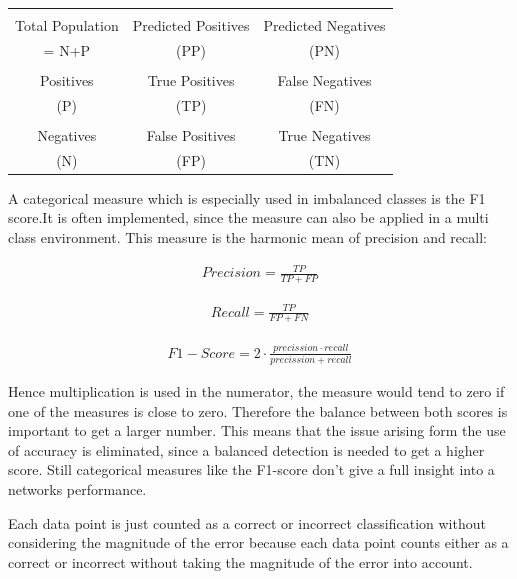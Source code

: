 \documentclass[
a4paper, 
12pt,
grayscalebody, %
abstract=on,
twoside, BCOR10mm, 12pt, DIV13,headinclude, footexclude, final, abstracton, openright
]{ibireprt}
\numberwithin{equation}{chapter}
\numberwithin{table}{chapter}
\numberwithin{figure}{chapter}
\numberwithin{algorithm}{chapter}
\numberwithin{example}{chapter}
\numberwithin{example}{chapter}
\begin{document}
\begin{center}
	\begin{tabular}{c||c|c}
	
		& &\\
		Total Population	& Predicted Positives & Predicted Negatives  	\\
		= N+P & (PP) &(PN)\\
		\hline
		\hline
		& &\\
		Positives &  True Positives& False Negatives   \\
		(P)& (TP)&(FN)\\
		\hline
		& &\\
		Negatives & False Positives  & True Negatives  	\\
		(N)&(FP) &(TN)\\
	\end{tabular}
\end{center}

A categorical measure which is especially used in imbalanced classes is the F1 score.It is often implemented, since the measure can also be applied in a multi class environment. This measure is the harmonic mean of precision and recall: %

\begin{align}
 	Precision = \frac{TP}{TP+FP}
\end{align}

\begin{align}
	Recall = \frac{TP}{FP+FN}
\end{align}

\begin{align}
	F1-Score = 2\cdot \frac{precission\cdot recall}{precission+recall}
\end{align}

Hence multiplication is used in the numerator, the measure would tend to zero if one of the measures is close to zero. Therefore the balance between both scores is important to get a larger number. This means that the issue arising form the use of accuracy is eliminated, since a balanced detection is needed to get a higher score. Still categorical measures like the F1-score don't give a full insight into a networks performance.

Each data point is just counted as a correct or incorrect classification without considering the magnitude of the error because each data point counts either as a correct or incorrect without taking the magnitude of the error into account. \cite{Dinga2019}
\end{document}
